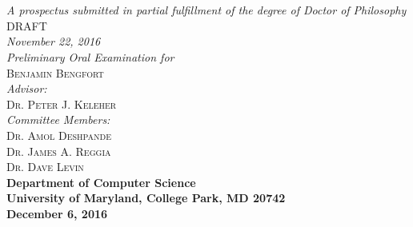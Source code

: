 \documentclass{article}
\begin{document}
\begin{titlepage}
\begin{center}

\textsc{\huge \bfseries {}}\\
\textsc{\huge \bfseries {}}\\[1.0cm]

\emph{A prospectus submitted in partial fulfillment of the degree of Doctor of
Philosophy}\\[5.5cm]

\textsc{\large DRAFT}\\
\emph{November 22, 2016}\\[2.0cm]

\emph{Preliminary Oral Examination for}\\
\textsc{\large Benjamin Bengfort}\\[2.0cm] %
\emph{Advisor:} \\
\textsc{Dr. Peter J. Keleher}\\[.5cm]
\emph{Committee Members:}\\
\textsc{Dr. Amol Deshpande}\\
\textsc{Dr. James A. Reggia}\\
\textsc{Dr. Dave Levin}\\[4.0cm]

{\bfseries Department of Computer Science}\\
{\bfseries University of Maryland, College Park, MD 20742}\\
{\bfseries December 6, 2016}
\vfill

\end{center}

\end{titlepage}

\newpage
\thispagestyle{empty}
\mbox{}
\end{document}
